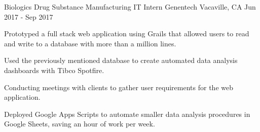 

\begin{cventries}

  \cventry
  {Biologics Drug Substance Manufacturing IT Intern} %
  {Genentech} %
  {Vacaville, CA} %
  {Jun 2017 - Sep 2017} %
  {
  \begin{cvitems} %
    \item {Prototyped a full stack web application using Grails that allowed users to read and write to a database with more than a million lines.}
    \item {Used the previously mentioned database to create automated data analysis dashboards with Tibco Spotfire.}
    \item {Conducting meetings with clients to gather user requirements for the web application.}
    \item {Deployed Google Apps Scripts to automate smaller data analysis procedures in Google Sheets, saving an hour of work per week.}
  \end{cvitems}
  }
\end{cventries}
